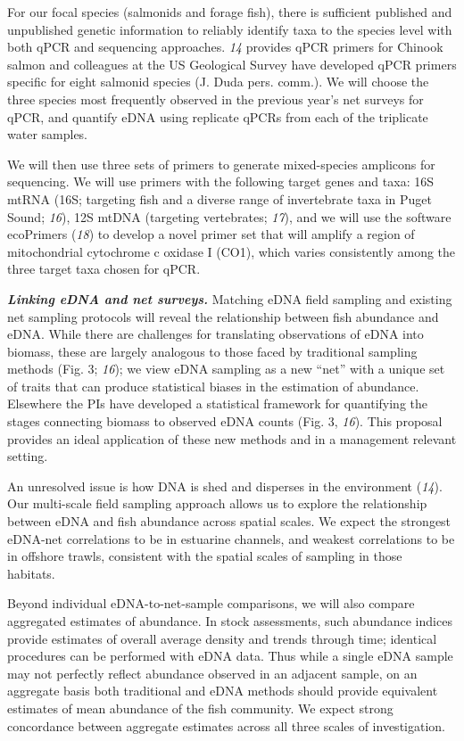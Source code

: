 \documentclass[]{article}
\begin{document}
For our focal species (salmonids and forage fish), there is sufficient
published and unpublished genetic information to reliably identify taxa
to the species level with both qPCR and sequencing approaches. \emph{14}
provides qPCR primers for Chinook salmon and colleagues at the US
Geological Survey have developed qPCR primers specific for eight
salmonid species (J. Duda pers. comm.). We will choose the three species
most frequently observed in the previous year's net surveys for qPCR,
and quantify eDNA using replicate qPCRs from each of the triplicate
water samples.{~}

We will then use three sets of primers to generate mixed-species
amplicons for sequencing. We will use primers with the following target
genes and taxa: 16S mtRNA (16S; targeting fish and a diverse range of
invertebrate taxa in Puget Sound; \emph{16}), 12S mtDNA (targeting
vertebrates; \emph{17}), and we will use the software ecoPrimers
(\emph{18}) to develop a novel primer set that will amplify a region of
mitochondrial cytochrome c oxidase I (CO1), which varies consistently
among the three target taxa chosen for qPCR.{~}

\textbf{\emph{Linking eDNA and net surveys.}} Matching \textbf{} eDNA
field sampling and existing net sampling protocols will reveal the
relationship between fish abundance and eDNA. While there are challenges
for translating observations of eDNA into biomass, these are largely
analogous to those faced by traditional sampling methods (Fig. 3;
\emph{16}); we view eDNA sampling as a new ``net'' with a unique set of
traits that can produce statistical biases in the estimation of
abundance. Elsewhere the PIs have developed a statistical framework for
quantifying the stages connecting biomass to observed eDNA counts (Fig.
3, \emph{16}). This proposal provides an ideal application of these new
methods and in a management relevant setting.

An unresolved issue is how DNA is shed and disperses in the environment
(\emph{14}). Our multi-scale field sampling approach allows us to
explore the relationship between eDNA and fish abundance across spatial
scales. We expect the strongest eDNA-net correlations to be in estuarine
channels, and weakest correlations to be in offshore trawls, consistent
with the spatial scales of sampling in those habitats.{~}

Beyond individual eDNA-to-net-sample comparisons, we will also compare
aggregated estimates of abundance. In stock assessments, such abundance
indices provide estimates of overall average density and trends through
time; identical procedures can be performed with eDNA data. Thus while a
single eDNA sample may not perfectly reflect abundance observed in an
adjacent sample, on an aggregate basis both traditional and eDNA methods
should provide equivalent estimates of mean abundance of the fish
community. We expect strong concordance between aggregate estimates
across all three scales of investigation.
\end{document}
